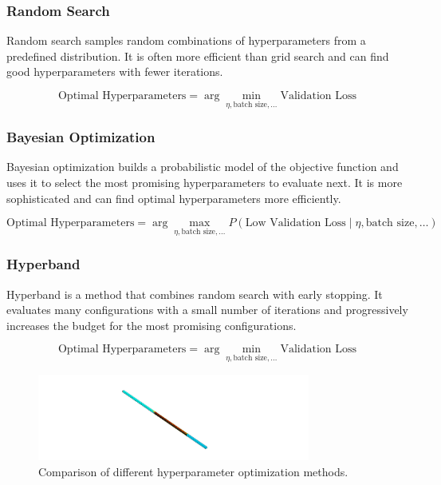 \documentclass{report}
\begin{document}
        \subsubsection{Random Search}
        
        Random search samples random combinations of hyperparameters from a predefined distribution. It is often more efficient than grid search and can find good hyperparameters with fewer iterations.
        
        \begin{equation}
        \text{Optimal Hyperparameters} = \arg \min_{\eta, \text{batch size}, \ldots} \text{Validation Loss}
        \end{equation}
        
        \subsubsection{Bayesian Optimization}
        
        Bayesian optimization builds a probabilistic model of the objective function and uses it to select the most promising hyperparameters to evaluate next. It is more sophisticated and can find optimal hyperparameters more efficiently.
        
        \begin{equation}
        \text{Optimal Hyperparameters} = \arg \max_{\eta, \text{batch size}, \ldots} P(\text{Low Validation Loss} \mid \eta, \text{batch size}, \ldots)
        \end{equation}
        
        \subsubsection{Hyperband}
        
        Hyperband is a method that combines random search with early stopping. It evaluates many configurations with a small number of iterations and progressively increases the budget for the most promising configurations.
        
        \begin{equation}
        \text{Optimal Hyperparameters} = \arg \min_{\eta, \text{batch size}, \ldots} \text{Validation Loss}
        \end{equation}
        
        \begin{figure}[h]
            \centering
            \includegraphics[width=0.8\textwidth]{00_Images/00_Velocity.png}
            \caption{Comparison of different hyperparameter optimization methods.}
            \label{fig:hyperparameter_optimization}
        \end{figure}
    
\end{document}
